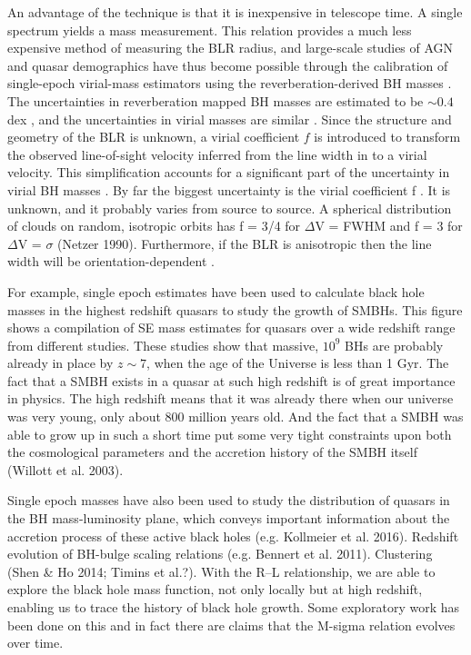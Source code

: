 An advantage of the technique is that it is inexpensive in telescope time. A single spectrum yields a mass measurement. 
This relation provides a much less expensive method of measuring the BLR radius, and large-scale studies of AGN and quasar demographics have thus become possible through the calibration of single-epoch virial-mass estimators using the reverberation-derived BH masses \citep[e.g.][]{greene05b,vestergaard06,vestergaard09,shen11,shen12,trakhtenbrot12}.
The uncertainties in reverberation mapped BH masses are estimated to be $\sim 0.4$ dex \citep[e.g.][]{peterson10}, and the uncertainties in virial masses are similar \citep[e.g.][]{vestergaard06}.
Since the structure and geometry of the BLR is unknown, a virial coefficient $f$ is introduced to transform the observed line-of-sight velocity inferred from the line width in to a virial velocity.
This simplification accounts for a significant part of the uncertainty in virial BH masses \citep[in addition to, for example, describing the BLR with a single radius $R$ and scatter in the $R-L$ relation;][]{shen13}. 
By far the biggest uncertainty is the virial coefficient f . 
It is unknown, and it probably varies from source to source.
A spherical distribution of clouds on random, isotropic orbits has f = 3/4 for $\Delta$V = FWHM and
f = 3 for $\Delta$V = $\sigma$ (Netzer 1990).
Furthermore, if the BLR is anisotropic \citep[for example, in a flattened disk; e.g.][]{jarvis06} then the line width will be orientation-dependent \citep[e.g.][]{runnoe13b,shen14,brotherton15}. 

For example, single epoch estimates have been used to calculate black hole masses in the highest redshift quasars to study the growth of SMBHs. 
This figure shows a compilation of SE mass estimates for quasars over a wide redshift range from different studies. 
These studies show that massive, $10^9$ BHs are probably already in place by $z\sim7$, when the age of the Universe is less than 1 Gyr.
The fact that a SMBH exists in a quasar at such high redshift is of great importance in physics.
The high redshift means that it was already there when our universe was very young, only about
800 million years old. And the fact that a SMBH was able to grow up in such a short time put
some very tight constraints upon both the cosmological parameters and the accretion history of the
SMBH itself (Willott et al. 2003).

Single epoch masses have also been used to study the distribution of quasars in the BH mass-luminosity plane, which conveys important information about the accretion process of these active black holes (e.g. Kollmeier et al. 2016). 
Redshift evolution of BH-bulge scaling relations (e.g. Bennert et al. 2011). 
Clustering (Shen \& Ho 2014; Timins et al.?). 
With the R–L relationship, we are able to explore the black hole mass function, not only locally but at high redshift, enabling us to trace the history of black hole growth.
Some exploratory work has been done on this and in fact there are claims that the M-sigma relation evolves over time. 

